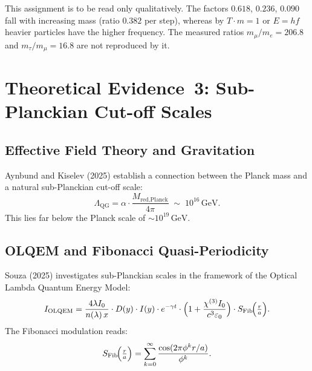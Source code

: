 \begin{table}[H]
\centering
\caption{Leptons as harmonics of the fundamental frequency~$f_0$ (qualitative analogy)}
\smallskip
{}
\end{table}
This assignment is to be read only qualitatively. The factors $0.618$, $0.236$, $0.090$ fall with increasing mass (ratio $0.382$ per step), whereas by $T\cdot m = 1$ or $E = hf$ heavier particles have the higher frequency. The measured ratios $m_\mu/m_e = 206.8$ and $m_\tau/m_\mu = 16.8$ are not reproduced by it.

\section{Theoretical Evidence~3: Sub-Planckian Cut-off Scales}

\subsection{Effective Field Theory and Gravitation}

Aynbund and Kiselev (2025) \cite{Aynbund2025} establish a connection
between the Planck mass and a natural sub-Planckian cut-off scale:
\begin{equation}
  \Lambda_{\text{QG}} = \alpha \cdot \frac{M_{\text{red,Planck}}}{4\pi}
  \;\sim\; 10^{16}\,\text{GeV}.
\end{equation}
This lies far below the Planck scale of $\sim 10^{19}\,\text{GeV}$.

\subsection{OLQEM and Fibonacci Quasi-Periodicity}

Souza (2025) \cite{subPlanck2025} investigates sub-Planckian scales in
the framework of the Optical Lambda Quantum Energy Model:
\begin{equation}
  I_{\text{OLQEM}}
  = \frac{4\lambda I_0}{n(\lambda)\,x} \cdot D(y) \cdot I(y)
    \cdot e^{-\gamma t}
    \cdot \Bigl(1+\frac{\chi^{(3)}I_0}{c^3\varepsilon_0}\Bigr)
    \cdot S_{\text{Fib}}\!\Bigl(\tfrac{r}{a}\Bigr).
\end{equation}
The Fibonacci modulation reads:
\begin{equation}
  S_{\text{Fib}}\!\Bigl(\tfrac{r}{a}\Bigr)
  = \sum_{k=0}^{\infty} \frac{\cos(2\pi\phi^k r/a)}{\phi^k}.
\end{equation}

